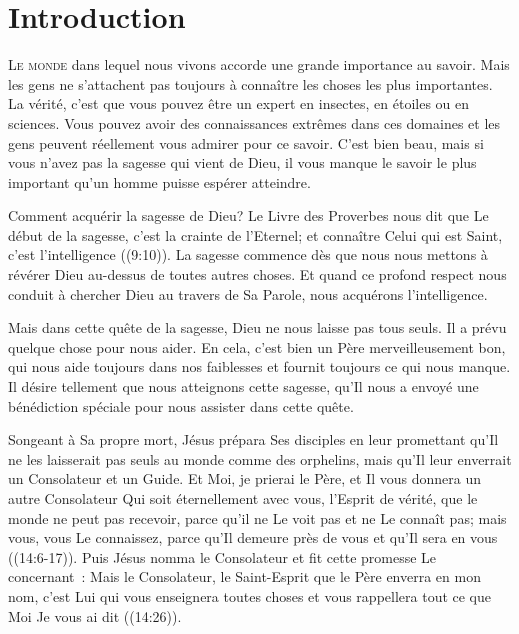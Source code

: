 
\chapter{Introduction}


\lettrine{L}{e monde} dans lequel nous vivons accorde une grande
 importance au savoir. Mais les gens ne s'attachent pas toujours
 à connaître les choses les plus importantes.
 La vérité, c'est que vous pouvez être un expert en insectes,
 en étoiles ou en sciences. Vous pouvez avoir des connaissances extrêmes
 dans ces domaines et les gens peuvent réellement vous admirer pour ce savoir.
 C'est bien beau, mais si vous n'avez pas la sagesse qui vient de Dieu,
 il vous manque le savoir le plus important qu'un homme puisse espérer atteindre.

Comment acquérir la sagesse de Dieu? Le Livre des Proverbes nous dit que
 \og Le début de la sagesse, c'est la crainte de l'Eternel;
 et connaître Celui qui est Saint, c'est l'intelligence \fg{}
 ((9:10)).
 La sagesse commence dès que nous nous mettons à révérer Dieu au-dessus
 de toutes autres choses. Et quand ce profond respect nous conduit
 à chercher Dieu au travers de Sa Parole, nous acquérons l'intelligence.

Mais dans cette quête de la sagesse, Dieu ne nous laisse pas tous seuls.
 Il a prévu quelque chose pour nous aider. En cela, c'est bien un Père
 merveilleusement bon, qui nous aide toujours dans nos faiblesses et fournit
 toujours ce qui nous manque. Il désire tellement que nous atteignons cette
 sagesse, qu'Il nous a envoyé une bénédiction spéciale pour nous assister
 dans cette quête. 

Songeant à Sa propre mort, Jésus prépara Ses disciples en leur promettant
 qu'Il ne les laisserait pas seuls au monde comme des orphelins,
 mais qu'Il leur enverrait un Consolateur et un Guide.
 \og Et Moi, je prierai le Père, et Il vous donnera un autre Consolateur
 Qui soit éternellement avec vous, l'Esprit de vérité, que le monde
 ne peut pas recevoir, parce qu'il ne Le voit pas et ne Le connaît pas;
 mais vous, vous Le connaissez, parce qu'Il demeure près de vous
 et qu'Il sera en vous \fg{} ((14:6-17)).
 Puis Jésus nomma le Consolateur et fit cette promesse Le concernant~:
 \og Mais le Consolateur, le Saint-Esprit que le Père enverra en mon nom,
 c'est Lui qui vous enseignera toutes choses et vous rappellera tout ce que
 Moi Je vous ai dit \fg{} ((14:26)).

